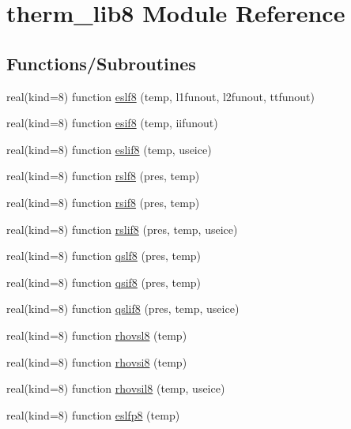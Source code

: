 \hypertarget{namespacetherm__lib8}{}\section{therm\+\_\+lib8 Module Reference}
\label{namespacetherm__lib8}
\subsection*{Functions/\+Subroutines}
\begin{DoxyCompactItemize}
\item 
real(kind=8) function \hyperlink{namespacetherm__lib8_aa7a527bdf772238306801f7f86e6db58}{eslf8} (temp, l1funout, l2funout, ttfunout)
\item 
real(kind=8) function \hyperlink{namespacetherm__lib8_a4c2e61543813926681cd581b4c72f0a9}{esif8} (temp, iifunout)
\item 
real(kind=8) function \hyperlink{namespacetherm__lib8_a1b4385a0130e311cf955294b6ae00f7a}{eslif8} (temp, useice)
\item 
real(kind=8) function \hyperlink{namespacetherm__lib8_ae2428f5fab9f3796e437eee297f7972b}{rslf8} (pres, temp)
\item 
real(kind=8) function \hyperlink{namespacetherm__lib8_a07814f1748b78bb1eb6f7cf12c6e2244}{rsif8} (pres, temp)
\item 
real(kind=8) function \hyperlink{namespacetherm__lib8_a0f62e29f88493f7bc240060f337ade98}{rslif8} (pres, temp, useice)
\item 
real(kind=8) function \hyperlink{namespacetherm__lib8_a91c0c02e09a53dfba149bcb4b83d13f6}{qslf8} (pres, temp)
\item 
real(kind=8) function \hyperlink{namespacetherm__lib8_a7b40fbdb54ace8154fe028b1c730dd72}{qsif8} (pres, temp)
\item 
real(kind=8) function \hyperlink{namespacetherm__lib8_aa9d6ede67f0021ccc80049f582b3177b}{qslif8} (pres, temp, useice)
\item 
real(kind=8) function \hyperlink{namespacetherm__lib8_a7637ae750048c15021f04db2db524ed9}{rhovsl8} (temp)
\item 
real(kind=8) function \hyperlink{namespacetherm__lib8_ab68e2d396a76f6b21291816fcfcc73a2}{rhovsi8} (temp)
\item 
real(kind=8) function \hyperlink{namespacetherm__lib8_ac356df009ed9ba07965dde7292121e0c}{rhovsil8} (temp, useice)
\item 
real(kind=8) function \hyperlink{namespacetherm__lib8_a3f44aca95e1fb010823bb94ede3d19ca}{eslfp8} (temp)

\end{DoxyCompactItemize}
